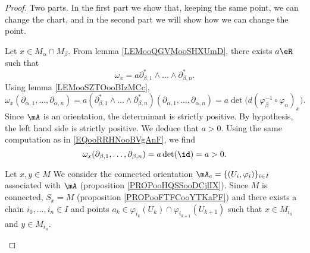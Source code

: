 \begin{proof}

	Two parts. In the first part we show that, keeping the same point, we can change the chart, and in the second part we will show how we can change the point.

	\begin{subproof}


		Let \( x\in M_{\alpha}\cap M_{\beta}\). From lemma \ref{LEMooQGVMooSHXUmD}, there exists \(a \eR  \) such that
		\begin{equation}
			\omega_x=a\partial^*_{\beta,1}\wedge\ldots\wedge\partial^*_{\beta,n}.
		\end{equation}
		Using lemma \ref{LEMooSZTOooBIzMCc},
		\begin{equation}
			\omega_x(\partial_{\alpha,1},\ldots,\partial_{\alpha,n})=a(\partial^*_{\beta,1}\wedge\ldots\wedge\partial^*_{\beta,n})(\partial_{\alpha,1},\ldots,\partial_{\alpha,n})=a\det\big( d(\varphi_{\beta}^{-1}\circ\varphi_{\alpha})_x \big).
		\end{equation}
		Since \( \mA\) is an orientation, the determinant is strictly positive. By hypothesis, the left hand side is strictly positive. We deduce that \( a>0\). Using the same computation as in \eqref{EQooRRHNooBVgAnF}, we find
		\begin{equation}
			\omega_x(\partial_{\beta,1},\ldots,\partial_{\beta,n})=a\det(\id)=a>0.
		\end{equation}

		Let \( x,y\in M\) We consider the connected orientation \( \mA_c=\{ (U_i,\varphi_i) \}_{i\in I}\) associated with \( \mA\) (proposition \ref{PROPooHQSSooDCjlIX}). Since \( M\) is connected, \( S_x=M\) (proposition \ref{PROPooFTFCooYTKaPF}) and there exists a chain \( i_0,\ldots,i_n\in I\)  and points \( a_k\in \varphi_{i_k}(U_k)\cap\varphi_{i_{k+1}}(U_{k+1})\) such that \( x\in M_{i_0}\) and \( y\in M_{i_n}\).



\end{subproof}
\end{proof}
